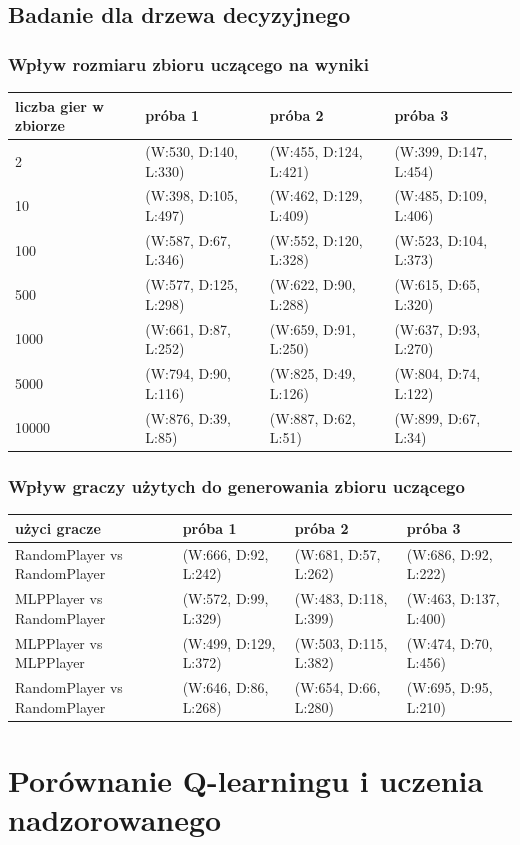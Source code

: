 \documentclass{article}
\begin{document}
\subsection{Badanie dla drzewa decyzyjnego}

\subsubsection{Wpływ rozmiaru zbioru uczącego na wyniki}

\begin{center}
  \begin{tabular}{ | l | l | l | l | }
    \hline
    liczba gier w zbiorze & próba 1 & próba 2 & próba 3 \\ \hline
    2 & (W:530, D:140, L:330) & (W:455, D:124, L:421) & (W:399, D:147, L:454) \\ \hline
    10 & (W:398, D:105, L:497) & (W:462, D:129, L:409) & (W:485, D:109, L:406) \\ \hline
    100 & (W:587, D:67, L:346) & (W:552, D:120, L:328) & (W:523, D:104, L:373) \\ \hline
    500 & (W:577, D:125, L:298) & (W:622, D:90, L:288) & (W:615, D:65, L:320) \\ \hline
    1000 & (W:661, D:87, L:252) & (W:659, D:91, L:250) & (W:637, D:93, L:270) \\ \hline
    5000 & (W:794, D:90, L:116) & (W:825, D:49, L:126) & (W:804, D:74, L:122) \\ \hline
    10000 & (W:876, D:39, L:85) & (W:887, D:62, L:51) & (W:899, D:67, L:34) \\ \hline
  \end{tabular}
\end{center}

\subsubsection{Wpływ graczy użytych do generowania zbioru uczącego}

\begin{center}
  \begin{tabular}{ | l | l | l | l | }
    \hline
    użyci gracze & próba 1 & próba 2 & próba 3 \\ \hline
    RandomPlayer vs RandomPlayer & (W:666, D:92, L:242) & (W:681, D:57, L:262) & (W:686, D:92, L:222) \\ \hline
    MLPPlayer vs RandomPlayer & (W:572, D:99, L:329) & (W:483, D:118, L:399) & (W:463, D:137, L:400) \\ \hline
    MLPPlayer vs MLPPlayer & (W:499, D:129, L:372) & (W:503, D:115, L:382) & (W:474, D:70, L:456) \\ \hline
    RandomPlayer vs RandomPlayer & (W:646, D:86, L:268) & (W:654, D:66, L:280) & (W:695, D:95, L:210) \\ \hline
  \end{tabular}
\end{center}


\section{Porównanie Q-learningu i uczenia nadzorowanego}
\end{document}
